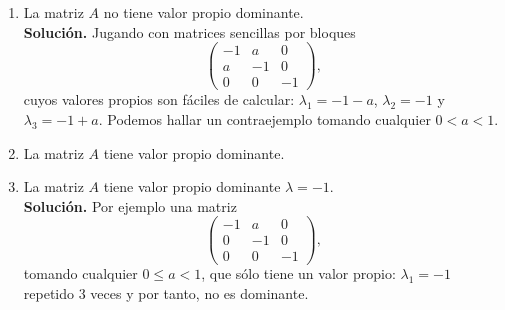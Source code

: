 \documentclass[12pt]{article}
\begin{document}
\begin{ejercicio}[3 puntos]
\begin{enumerate}[label=\alph*)]
			\item La matriz $A$ no tiene valor propio dominante.\\
				
				\textbf{Solución. } Jugando con matrices sencillas por bloques
				$$\begin{pmatrix} -1 & a & 0 \\ a & -1 & 0 \\ 0 & 0 & -1 \end{pmatrix},$$ 
				cuyos valores propios son fáciles de calcular: $\lambda_1 = -1 - a$, $\lambda_2 = -1$ y $\lambda_3 = -1 + a$. Podemos hallar un contraejemplo tomando cualquier $0 < a < 1$.
				
				
			\item La matriz $A$ tiene valor propio dominante.
			\item La matriz $A$ tiene valor propio dominante $\lambda = -1$. \\
			
				\textbf{Solución. } Por ejemplo una matriz 
				$$\begin{pmatrix} -1 & a & 0 \\ 0 & -1 & 0 \\ 0 & 0 & -1 \end{pmatrix},$$ 
				tomando cualquier $0 \leq a < 1$, que sólo tiene un valor propio: $\lambda_1 = -1$ repetido 3 veces y por tanto, no es dominante.
		\end{enumerate}
	\end{ejercicio}
\end{document}
